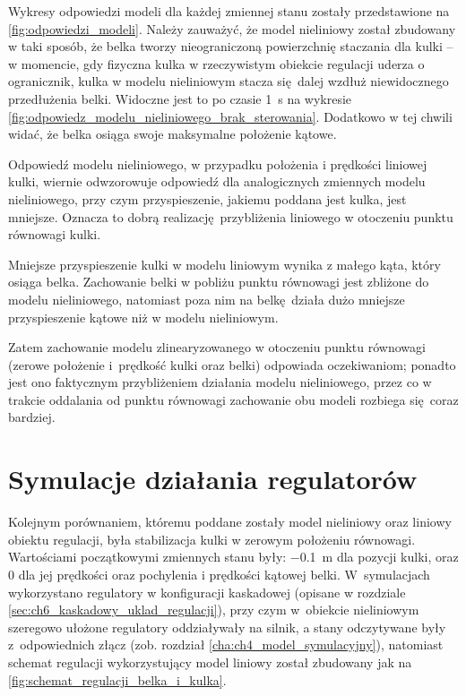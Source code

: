 Wykresy odpowiedzi modeli dla każdej zmiennej stanu zostały przedstawione na \cref{fig:odpowiedzi_modeli}. Należy zauważyć, że model nieliniowy został zbudowany w taki sposób, że belka tworzy nieograniczoną powierzchnię staczania dla kulki -- w momencie, gdy fizyczna kulka w rzeczywistym obiekcie regulacji uderza o ogranicznik, kulka w modelu nieliniowym stacza się dalej wzdłuż niewidocznego przedłużenia belki. Widoczne jest to po czasie \SI{1}{\second} na wykresie \ref{fig:odpowiedz_modelu_nieliniowego_brak_sterowania}. Dodatkowo w tej chwili widać, że belka osiąga swoje maksymalne położenie kątowe.

Odpowiedź modelu nieliniowego, w przypadku położenia i prędkości liniowej kulki, wiernie odwzorowuje odpowiedź dla analogicznych zmiennych modelu nieliniowego, przy czym przyspieszenie, jakiemu poddana jest kulka, jest mniejsze. Oznacza to dobrą realizację przybliżenia liniowego w otoczeniu punktu równowagi kulki.

Mniejsze przyspieszenie kulki w modelu liniowym wynika z małego kąta, który osiąga belka. Zachowanie belki w pobliżu punktu równowagi jest zbliżone do modelu nieliniowego, natomiast poza nim na belkę działa dużo mniejsze przyspieszenie kątowe niż w modelu nieliniowym.

Zatem zachowanie modelu zlinearyzowanego w otoczeniu punktu równowagi (zerowe położenie i~prędkość kulki oraz belki) odpowiada oczekiwaniom; ponadto jest ono faktycznym przybliżeniem działania modelu nieliniowego, przez co w trakcie oddalania od punktu równowagi zachowanie obu modeli rozbiega się coraz bardziej.

\section{Symulacje działania regulatorów}
\label{sec:ch9_symulacje_regulatorow}

Kolejnym porównaniem, któremu poddane zostały model nieliniowy oraz liniowy obiektu regulacji, była stabilizacja kulki w zerowym położeniu równowagi. Wartościami początkowymi zmiennych stanu były: \SI{-0.1}{\meter} dla pozycji kulki, oraz \num{0} dla jej prędkości oraz pochylenia i prędkości kątowej belki. W~symulacjach wykorzystano regulatory w konfiguracji kaskadowej (opisane w rozdziale \ref{sec:ch6_kaskadowy_uklad_regulacji}), przy czym w~obiekcie nieliniowym szeregowo ułożone regulatory oddziaływały na silnik, a stany odczytywane były z~odpowiednich złącz (zob. rozdział \ref{cha:ch4_model_symulacyjny}), natomiast schemat regulacji wykorzystujący model liniowy został zbudowany jak na \cref{fig:schemat_regulacji_belka_i_kulka}.

